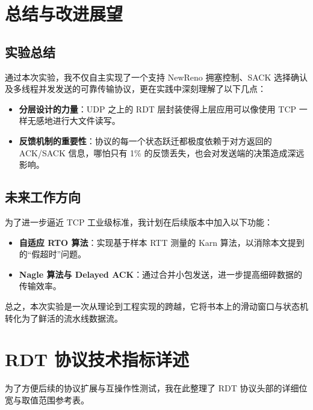 \documentclass[UTF8,a4paper,10pt]{ctexart}
\begin{document}
\section{总结与改进展望}

\subsection{实验总结}
通过本次实验，我不仅自主实现了一个支持 NewReno 拥塞控制、SACK 选择确认及多线程并发发送的可靠传输协议，更在实践中深刻理解了以下几点：
\begin{itemize}
    \item \textbf{分层设计的力量}：UDP 之上的 RDT 层封装使得上层应用可以像使用 TCP 一样无感地进行大文件读写。
    \item \textbf{反馈机制的重要性}：协议的每一个状态跃迁都极度依赖于对方返回的 ACK/SACK 信息，哪怕只有 1\% 的反馈丢失，也会对发送端的决策造成深远影响。
\end{itemize}

\subsection{未来工作方向}
为了进一步逼近 TCP 工业级标准，我计划在后续版本中加入以下功能：
\begin{itemize}
    \item \textbf{自适应 RTO 算法}：实现基于样本 RTT 测量的 Karn 算法，以消除本文提到的“假超时”问题。
    \item \textbf{Nagle 算法与 Delayed ACK}：通过合并小包发送，进一步提高细碎数据的传输效率。
\end{itemize}

总之，本次实验是一次从理论到工程实现的跨越，它将书本上的滑动窗口与状态机转化为了鲜活的流水线数据流。

\newpage
\appendix
\section{RDT 协议技术指标详述}

为了方便后续的协议扩展与互操作性测试，我在此整理了 RDT 协议头部的详细位宽与取值范围参考表。
\end{document}

